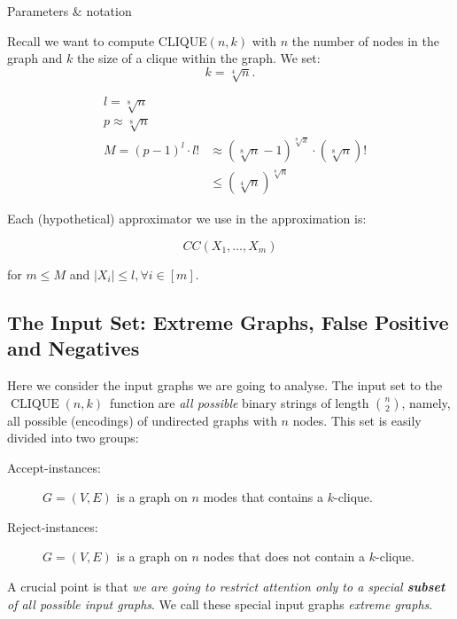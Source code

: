 \begin{trailer}{Parameters \& notation}

Recall we want to compute CLIQUE$(n, k)$
with $n$ the number of nodes in the graph and $k$ the size of a clique within the graph. 
We set:
$$
k=\sqrt[4]{n}.
$$


$$
\begin{aligned}
& l=\sqrt[8]{n} \\
& p \approx \sqrt[8]{n} \\
& M=(p-1)^l \cdot l! & \approx(\sqrt[8]{n}-1)^{\sqrt[8]{x}} \cdot(\sqrt[8]{n})! \\
& & \leq(\sqrt[4]{n})^{\sqrt[8]{n}}
\end{aligned}
$$


Each (hypothetical) approximator we use in the approximation is:

$$
C C\left(X_1, \ldots, X_m\right)
$$

for $m \leq M$ and $\left|X_i\right| \leq l, \forall i \in[m]$.
\end{trailer}

\newcommand{\cliquenk}{\ensuremath{\operatorname{CLIQUE}(n,k)}}

\subsection{The Input Set: Extreme Graphs, False Positive and  Negatives}

Here we consider the input graphs we are going to analyse. 
The input set to the \cliquenk\ function are \emph{all possible} binary strings of length $n\choose 2$, namely, all possible (encodings) of undirected graphs with $n$ nodes. This set is easily divided into two groups:

\begin{description}
\item[Accept-instances:] 
$G=(V, E)$ is a graph on $n$ modes that contains a $k$-clique.
\item[Reject-instances:]
$G=(V, E)$ is a graph on $n$ nodes that does not contain a $k$-clique.
\end{description}


 



A crucial point is that \emph{we are going to restrict attention only to a special \textbf{subset} of all possible input graphs}. We call these special input graphs \emph{extreme graphs}. 

